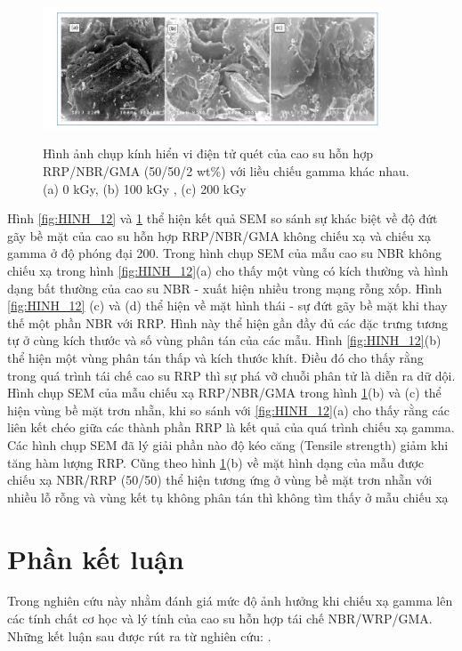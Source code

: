 \documentclass[12pt,a4paper]{article}
\begin{document}
	\begin{figure}
			\centering
			\includegraphics[width=0.9\textwidth]{15.JPG}
			\label{fig:HINH_13}
			\caption{Hình ảnh chụp kính hiển vi điện tử quét của cao su hỗn hợp RRP/NBR/GMA (50/50/2 wt\%) với liều chiếu gamma khác nhau. (a) 0 kGy, (b) 100 kGy , (c) 200 kGy}
	\end{figure}
	
	
	Hình \ref{fig:HINH_12} và \ref{fig:HINH_13} thể hiện kết quả SEM so sánh sự khác biệt về độ đứt gãy bề mặt của cao su hỗn hợp RRP/NBR/GMA không chiếu xạ và chiếu xạ gamma ở độ phóng đại 200. Trong hình chụp SEM của mẫu cao su NBR không chiếu xạ trong hình \ref{fig:HINH_12}(a) cho thấy một vùng có kích thường và hình dạng bất thường của cao su NBR - xuất hiện nhiều trong mạng rỗng xốp. Hình \ref{fig:HINH_12} (c) và (d) thể hiện về mặt hình thái - sự đứt gãy bề mặt khi thay thế một phần NBR với RRP. Hình này thể hiện gần đầy đủ các đặc trưng tương tự ở cùng kích thước và số vùng phân tán của các mẫu. Hình \ref{fig:HINH_12}(b) thể hiện một vùng phân tán thấp và kích thước khít. Điều đó cho thấy rằng trong quá trình tái chế cao su RRP thì sự phá vỡ chuỗi phân tử là diễn ra dữ dội. Hình chụp SEM của mẫu chiếu xạ RRP/NBR/GMA trong hình \ref{fig:HINH_13}(b) và (c) thể hiện vùng bề mặt trơn nhẵn, khi so sánh với \ref{fig:HINH_12}(a) cho thấy rằng các liên kết chéo giữa các thành phần RRP là kết quả của quá trình chiếu xạ gamma. Các hình chụp SEM đã lý giải phần nào độ kéo căng (Tensile strength) giảm khi tăng hàm lượng RRP. Cũng theo hình \ref{fig:HINH_13}(b) về mặt hình dạng của mẫu được chiếu xạ NBR/RRP (50/50) thể hiện tương ứng ở vùng bề mặt trơn nhẵn với nhiều lỗ rỗng và vùng kết tụ không phân tán thì không tìm thấy ở mẫu chiếu xạ
	
	\section{Phần kết luận}
	
	Trong nghiên cứu này nhằm đánh giá mức độ ảnh hưởng khi chiếu xạ gamma lên các tính chất cơ học và lý tính của cao su hỗn hợp tái chế NBR/WRP/GMA. Những kết luận sau được rút ra từ nghiên cứu: .
	
\end{document}
